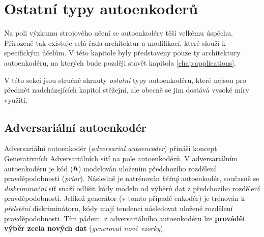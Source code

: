 \section{Ostatní typy autoenkoderů}
Na poli výzkumu strojového učení se autoenkodéry těší velkému úspěchu. Přirozeně tak existuje celá řada architektur a modifikací, které slouží k specifickým účelům.
V této kapitole byly představeny pouze ty architektury autoenkodéru, na kterých bude později stavět kapitola \autoref{chap:applications}.

V této sekci jsou stručně shrnuty \emph{ostatní} typy autoenkodérů, které nejsou pro předmět nadcházejících kapitol stěžejní, ale obecně se jim dostává vysoké míry využití.

\subsection{Adversariální autoenkodér}
Adversariální autoenkodér (\emph{adversarial autoencoder}) přináší koncept Generativních Adversariálních sítí \cite{Goodfellow2014} na pole autoenkodérů.
V adversariálním autoenkodéru je kód ($\textbf{\emph{h}}$) modelován uložením předchozího rozdělení pravděpodobnosti (\emph{prior}).
Následně je natrénován \emph{běžný} autoenkodér, současně se \emph{diskriminační} síť snaží odlišit kódy modelu od výběrů dat z předchozího rozdělení pravděpodobnosti.
Jelikož generátor (v tomto případě enkodér) je trénován k \emph{přelstění} diskriminátoru, kódy mají tendenci následovat uložené rozdělení pravděpodobnosti.
Tím pádem, z adversariálního autoenkodéru lze \textbf{provádět výběr zcela nových dat} (\emph{generovat nové vzorky}). \cite{Charte2018}

